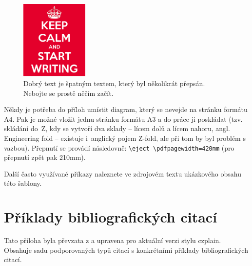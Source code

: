 \begin{figure}[hbt]
	\centering
	\includegraphics[width=0.3\textwidth]{obrazky-figures/keep-calm.png}
	\caption{Dobrý text je špatným textem, který byl několikrát přepsán. Nebojte se prostě něčím začít.}
	\label{keepCalm}
\end{figure}

Někdy je potřeba do příloh umístit diagram, který se nevejde na stránku formátu A4. Pak je možné vložit jednu stránku formátu A3 a do práce ji poskládat (tzv. skládání do~Z, kdy se vytvoří dva sklady -- lícem dolů a lícem nahoru, angl. Engineering fold -- existuje i~anglický pojem Z-fold, ale při tom by byl problém s vazbou). Přepnutí se provádí následovně: \texttt{\textbackslash{}eject \textbackslash{}pdfpagewidth=420mm} (pro přepnutí zpět pak 210mm).

Další často využívané příkazy naleznete ve zdrojovém textu ukázkového obsahu této šablony.




\newcommand{\zarazky}{%
Lokace ve zdrojovém dokumentu: \= %
Some horribly long example \= \kill}

\newcommand{\odradkovani}{\\[0.3em]}

\chapter{Příklady bibliografických citací}
\label{priloha-priklady-citaci}
Tato příloha byla převzata z \cite{Pysny} a upravena pro aktuální verzi stylu czplain. Obsahuje sadu podporovaných typů citací s konkrétními příklady bibliografických citací. 

